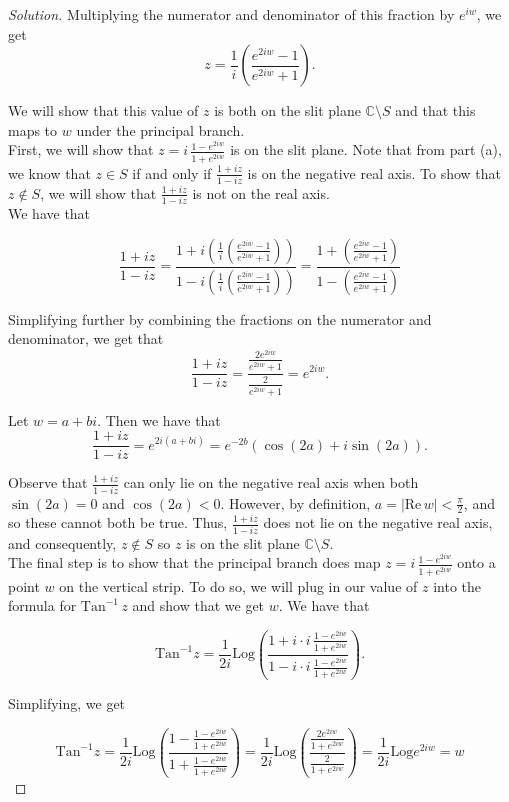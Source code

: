 \documentclass[11pt]{article}
\newcommand{\C}{\mathbb{C}}
\newenvironment{solution}
  {\renewcommand\qedsymbol{$\blacksquare$}\begin{proof}[Solution]}
  {\end{proof}}
\theoremstyle{definition}
\begin{document}
\begin{enumerate}[a)]
\begin{solution}
Multiplying the numerator and denominator of this fraction by $e^{iw}$, we get
\[ z = \frac{1}{i} \left( \frac{e^{2iw} - 1}{e^{2iw} + 1}\right).\]

We will show that this value of $z$ is both on the slit plane $\C \setminus S$ and that this maps to $w$ under the principal branch. \\

First, we will show that $z = i \, \frac{1-e^{2iw}}{1+e^{2iw}}$ is on the slit plane. Note that from part (a), we know that $z \in S$ if and only if $\frac{1+iz}{1-iz}$ is on the negative real axis. To show that $z \notin S$, we will show that $\frac{1+iz}{1-iz}$ is not on the real axis. \\

We have that 

\[ \frac{1+iz}{1-iz} = \frac{1 + i\left( \frac{1}{i} \left( \frac{e^{2iw} - 1}{e^{2iw} + 1}\right) \right)}{1 - i\left( \frac{1}{i} \left( \frac{e^{2iw} - 1}{e^{2iw} + 1}\right)\right)} = \frac{1 + \left( \frac{e^{2iw} - 1}{e^{2iw} + 1}\right)}{1- \left( \frac{e^{2iw} - 1}{e^{2iw} + 1}\right)}\]

Simplifying further by combining the fractions on the numerator and denominator, we get that
\[ \frac{1+iz}{1-iz} = \frac{\frac{2e^{2iw}}{e^{2iw} + 1}}{\frac{2}{e^{2iw} + 1}} = e^{2iw}.\]

Let $w = a + bi$. Then we have that \[ \frac{1+iz}{1-iz} = e^{2i(a+bi)} = e^{-2b}\left(\cos(2a) + i \sin (2a)\right). \]

Observe that $\frac{1+iz}{1-iz}$ can only lie on the negative real axis when both $\sin(2a) = 0$ and $\cos(2a) < 0$. 
However, by definition, $a = |\mathrm{Re} \, w| < \frac{\pi}{2}$, and so these cannot both be true. Thus, $\frac{1+iz}{1-iz}$ does not lie on the negative real axis, and consequently, $z \notin S$ so $z$ is on the slit plane $\C \setminus S.$ \\

The final step is to show that the principal branch does map $z = i \, \frac{1-e^{2iw}}{1+e^{2iw}}$ onto a point $w$ on the vertical strip. To do so, we will plug in our value of $z$ into the formula for $\mathrm{Tan}^{-1}\, z$ and show that we get $w$. We have that

\[\mathrm{Tan}^{-1} z = \frac{1}{2i} \mathrm{Log} \left(\frac{1 + i\cdot i \, \frac{1-e^{2iw}}{1+e^{2iw}}}{1- i\cdot i \, \frac{1-e^{2iw}}{1+e^{2iw}}}\right).\]

Simplifying, we get

\[\mathrm{Tan}^{-1} z = \frac{1}{2i} \mathrm{Log} \left(\frac{1 - \frac{1-e^{2iw}}{1+e^{2iw}}}{1 + \frac{1-e^{2iw}}{1+e^{2iw}}}\right) = \frac{1}{2i} \mathrm{Log} \left( \frac{\frac{2e^{2iw}}{1+e^{2iw}}}{\frac{2}{1+e^{2iw}}}\right) = \frac{1}{2i}\mathrm{Log} e^{2iw} = w\]


\end{solution}
\end{enumerate}
\end{document}
